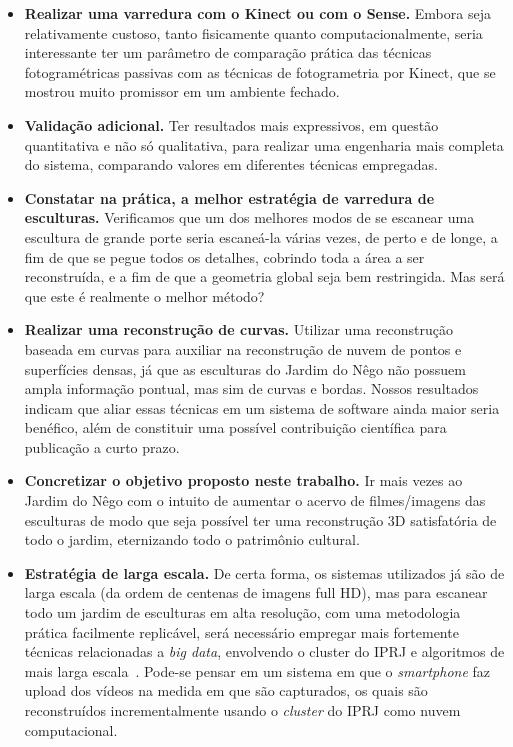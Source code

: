 \begin{itemize}
\item \textbf{Realizar uma varredura com o Kinect ou com o Sense.} Embora seja relativamente
  custoso, tanto fisicamente quanto computacionalmente, seria interessante ter
  um parâmetro de comparação prática das técnicas fotogramétricas passivas com
as técnicas de fotogrametria por Kinect, que se mostrou muito promissor em um
ambiente fechado.  
\item \textbf{Validação adicional.} Ter resultados mais
  expressivos, em questão quantitativa e não só qualitativa, para realizar uma
  engenharia mais completa do sistema, comparando valores em diferentes técnicas
  empregadas.
\item \textbf{Constatar na prática, a melhor estratégia de varredura de
  esculturas.}
Verificamos que um dos melhores modos de se escanear uma escultura de grande
porte seria escaneá-la várias vezes, de perto e de longe, a fim de que se pegue todos os detalhes,
cobrindo toda a área a ser reconstruída, e a fim de que a geometria global seja
bem restringida. Mas será que este é realmente o melhor método?  
\item \textbf{Realizar uma reconstrução de curvas.} 
  Utilizar uma reconstrução baseada em curvas para auxiliar na reconstrução de
  nuvem de pontos e superfícies densas, já que as esculturas do Jardim do Nêgo
  não possuem ampla informação pontual, mas sim de curvas e bordas. Nossos
  resultados indicam que aliar essas técnicas em um sistema de software ainda
  maior seria benéfico, além de constituir uma possível contribuição científica
  para publicação a curto prazo.
\item \textbf{Concretizar o objetivo proposto neste trabalho.} Ir mais vezes
  ao Jardim do Nêgo com o intuito de aumentar o acervo de filmes/imagens das
  esculturas de modo que seja possível ter uma reconstrução 3D satisfatória de
  todo o jardim, eternizando todo o patrimônio cultural.  
\item \textbf{Estratégia de larga escala.} De certa forma, os sistemas
  utilizados já são de
  larga escala (da ordem de centenas de imagens full HD), mas para escanear todo um jardim de esculturas em alta
  resolução, com uma metodologia prática facilmente replicável,
  será necessário empregar mais fortemente técnicas relacionadas a \emph{big data}, envolvendo o cluster do IPRJ
  e algoritmos de mais larga escala~\cite{Argarwal:Snavely:etal:ICCV09}. Pode-se pensar em um sistema em que o
  \emph{smartphone} faz upload dos vídeos na medida em que são capturados, os
  quais são reconstruídos incrementalmente usando o \emph{cluster} do IPRJ como nuvem computacional.
\end{itemize}
